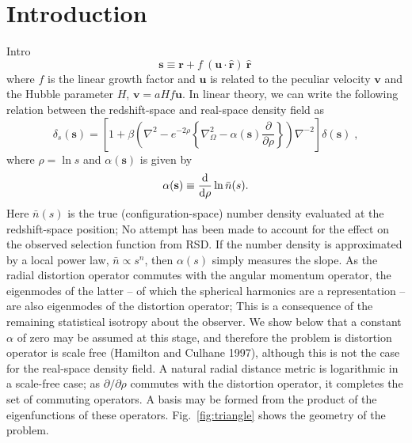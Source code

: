 \documentclass[useAMS,usenatbib]{mn2e}
\newcommand{\der}{\ensuremath{{\rm d}}}
\newcommand{\vb}[1]{\mathbf{#1}}
\begin{document}
\section{Introduction}
Intro
\begin{equation}
  \vb{s} \equiv \vb{r} + f \ (\vb{u} \cdot \boldsymbol {\hat r}) \ \boldsymbol{\hat r}\,
\end{equation}
where $f$ is the linear growth factor and $\vb{u}$ is related to the peculiar velocity $\vb{v}$ and the Hubble parameter $H$, $\vb{v} =  aH f \vb{u}$. In linear theory, we can write the following relation between the redshift-space and real-space density field as %
\begin{equation}
\label{eq:RSD}
\delta_s(\vb{s}) = \left[1+ \beta \left(\nabla^2 - e^{-2 \rho} \left \{ \nabla^2_{\Omega} - \alpha(\vb{s}) \frac{\partial}{\partial \rho} \right \} \right) \nabla^{-2} \right] \delta(\vb{s}) \;,
\end{equation}
where $\rho = \ln s$ and $\alpha(\vb{s})$ is given by 
\begin{equation}
\alpha(\vb{s}) \equiv \frac{\der}{\der \rho} \ln \bar n(s).
\end{equation}
Here $\bar n(s)$ is the true (configuration-space) number density evaluated at the redshift-space position; No attempt has been made to account for the effect on the observed selection function from RSD.  If the number density is approximated by a local power law, $\bar n \propto s^n$, then $\alpha(s)$ simply measures the slope.  As the radial distortion operator commutes with the angular momentum operator, the eigenmodes of the latter -- of which the spherical harmonics are a representation -- are also eigenmodes of the distortion operator; This is a consequence of the remaining statistical isotropy about the observer.  We show below that a constant $\alpha$ of zero may be assumed at this stage, and therefore the problem is distortion operator is scale free (Hamilton and Culhane 1997), although this is not the case for the real-space density field.  A natural radial distance metric is logarithmic in a scale-free case; as $\partial / \partial \rho$ commutes with the distortion operator, it completes the set of commuting operators.  A basis may be formed from the product of the eigenfunctions of these operators.   Fig.~\ref{fig:triangle} shows the geometry of the problem.  
\end{document}
